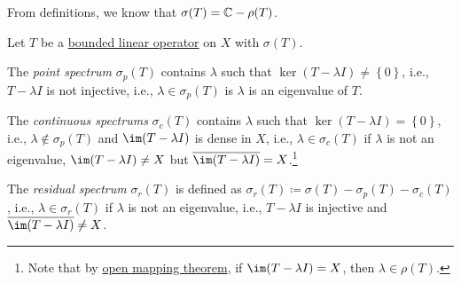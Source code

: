 From definitions, we know that \(\sigma (T) = \mathbb{\MakeUppercase{c}} - \rho (T)\).

\begin{definition*}
	Let \(T\) be a \hyperref[def:bounded-linear-op]{bounded linear operator} on \(X\) with \(\sigma (T)\).
	\begin{definition}\label{def:point-spectrum}
		The \emph{point spectrum} \(\sigma _p(T)\) contains \(\lambda \) such that \(\ker(T - \lambda I) \neq \left\{ 0 \right\} \), i.e., \(T - \lambda I\) is not injective, i.e., \(\lambda \in \sigma _p(T)\) is \(\lambda \) is an eigenvalue of \(T\).
	\end{definition}
	\begin{definition}\label{def:continuous-spectrum}
		The \emph{continuous spectrums} \(\sigma _c(T)\) contains \(\lambda \) such that \(\ker(T - \lambda I) = \left\{ 0 \right\} \), i.e., \(\lambda \notin \sigma _p(T)\) and \(\im(T-\lambda I)\) is dense in \(X\), i.e., \(\lambda \in \sigma _c(T)\) if \(\lambda \) is not an eigenvalue, \(\im(T-\lambda I)\neq X\) but \(\overline{\im(T-\lambda I)}=X\).\footnote{Note that by \hyperref[thm:open-mapping]{open mapping theorem}, if \(\im(T - \lambda I)=X\), then \(\lambda \in \rho (T)\).}
	\end{definition}
	\begin{definition}\label{def:residual-spectrum}
		The \emph{residual spectrum} \(\sigma _r(T)\) is defined as \(\sigma _r(T)\coloneqq \sigma (T) - \sigma _p(T) - \sigma _c(T)\), i.e., \(\lambda \in \sigma _r(T)\) if \(\lambda \) is not an eigenvalue, i.e., \(T-\lambda I\) is injective and \(\overline{\im(T-\lambda I)}\neq X\).
	\end{definition}
\end{definition*}


